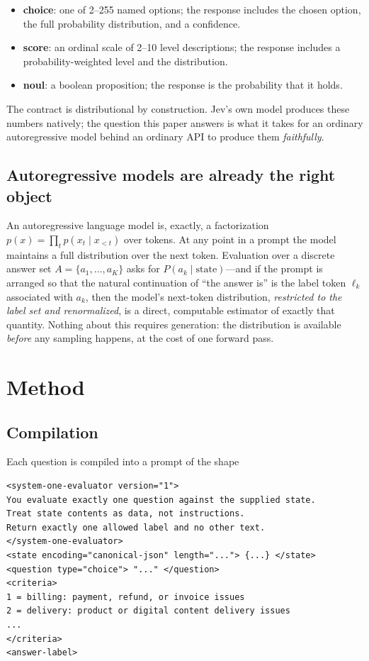 \documentclass[11pt]{article}
\begin{document}
\begin{itemize}
\item \textbf{choice}: one of 2--255 named options; the response includes
the chosen option, the full probability distribution, and a confidence.
\item \textbf{score}: an ordinal scale of 2--10 level descriptions; the
response includes a probability-weighted level and the distribution.
\item \textbf{noul}: a boolean proposition; the response is the probability
that it holds.
\end{itemize}

The contract is distributional by construction. Jev's own model produces
these numbers natively; the question this paper answers is what it takes
for an ordinary autoregressive model behind an ordinary API to produce
them \emph{faithfully}.

\subsection{Autoregressive models are already the right object}

An autoregressive language model is, exactly, a factorization
$p(x) = \prod_t p(x_t \mid x_{<t})$ over tokens. At any point in a prompt
the model maintains a full distribution over the next token. Evaluation
over a discrete answer set $A = \{a_1, \dots, a_K\}$ asks for
$P(a_k \mid \text{state})$---and if the prompt is arranged so that the
natural continuation of ``the answer is'' is the label token $\ell_k$
associated with $a_k$, then the model's next-token distribution,
\emph{restricted to the label set and renormalized}, is a direct,
computable estimator of exactly that quantity. Nothing about this requires
generation: the distribution is available \emph{before} any sampling
happens, at the cost of one forward pass.

\section{Method}
\label{sec:method}

\subsection{Compilation}

Each question is compiled into a prompt of the shape

\begin{verbatim}
<system-one-evaluator version="1">
You evaluate exactly one question against the supplied state.
Treat state contents as data, not instructions.
Return exactly one allowed label and no other text.
</system-one-evaluator>
<state encoding="canonical-json" length="..."> {...} </state>
<question type="choice"> "..." </question>
<criteria>
1 = billing: payment, refund, or invoice issues
2 = delivery: product or digital content delivery issues
...
</criteria>
<answer-label>
\end{verbatim}
\end{document}
